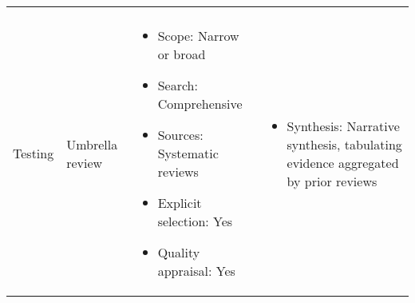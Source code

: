 \documentclass[11pt]{scrartcl}
\theoremstyle{aufgabenstyle}
\begin{document}
\begin{table}[H]
\begin{tabularx}{\textwidth}{l p{2.4cm} X X}
\begin{itemize}[leftmargin=*, noitemsep, topsep=0pt]
		\end{itemize} \\
		Testing & Umbrella review & 
		\begin{itemize}[leftmargin=*, noitemsep, topsep=0pt]
			\item Scope: Narrow or broad
			\item Search: Comprehensive
			\item Sources: Systematic reviews
			\item Explicit selection: Yes
			\item Quality appraisal: Yes
		\end{itemize} & 
		\begin{itemize}[leftmargin=*, noitemsep, topsep=0pt]
			\item Synthesis: Narrative synthesis, tabulating evidence aggregated by prior reviews
		\end{itemize} \\
		\bottomrule
	\end{tabularx}
\end{table}
\end{document}
